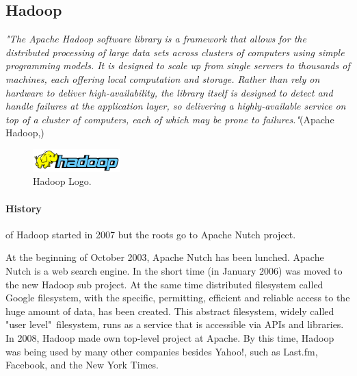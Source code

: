 \documentclass[a4paper,12pt,oneside]{report}
\begin{document}
	\subsection*{Hadoop}
	\emph{"The Apache Hadoop software library is a framework that allows for the
		distributed
		processing of large data sets across clusters of computers using simple
		programming 
		models. It is designed to scale up from single servers to 
		thousands of machines, each offering local computation and storage. Rather
		than rely 
		on hardware to deliver high-availability, the library itself is
		designed to detect and handle failures at the application layer, so
		delivering a 
		highly-available service on top of a cluster of computers,
		each of which may be prone to failures."}(Apache Hadoop,\cite{hadoop_web})
	\begin{figure}[!htbp]
		\centering
		\includegraphics[width=0.3\textwidth]{./img/664px-Hadoop_logo.png}
		\caption[Hadoop architecture2]{\centering Hadoop Logo.}
	\end{figure}
	
	\paragraph*{History} of Hadoop started in 2007 but the roots go
	to Apache Nutch project. 
	
	At the beginning of October 2003, Apache Nutch\cite{nutch_web} has been lunched.
	Apache Nutch is a  web search engine. In the short time (in January 2006) was
	moved to the new Hadoop sub project.
	At the same time  distributed filesystem called Google
	filesystem\cite{google_fs}, with the specific, permitting, efficient and
	reliable access	to the huge amount of data, has been created. This abstract filesystem, widely
	called "user level"~filesystem, runs as a service that is accessible via APIs and libraries. 
	In 2008, Hadoop made own top-level project at Apache.\cite{hadoop_news_web}
	By this time, Hadoop was being used by many
	other companies besides Yahoo!, such as Last.fm, Facebook, and the New York
	Times. 
	
\end{document}
